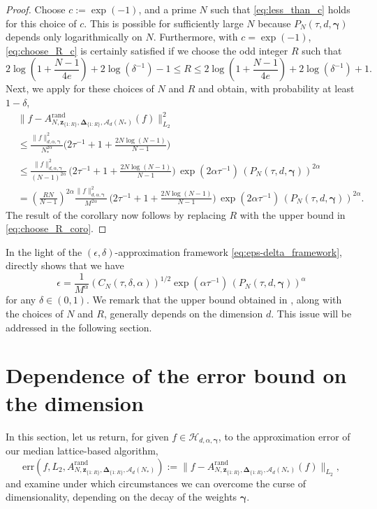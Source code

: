 \documentclass[pdflatex,sn-basic,Numbered]{sn-jnl}%
\newcommand{\rand}{\mathrm{rand}}
\newcommand{\bsz}{\boldsymbol{z}}
\newcommand{\bsgamma}{\boldsymbol{\gamma}}
\newcommand{\bsDelta}{\boldsymbol{\Delta}}
\newcommand{\Acal}{\mathcal{A}}
\newcommand{\Hcal}{\mathcal{H}}
\theoremstyle{thmstyleone}%
\theoremstyle{thmstyletwo}%
\begin{document}
\begin{proof}
 Choose $c := \exp(-1)$, and a prime $N$ such that \eqref{eq:less_than_c} holds for this choice of $c$. 
 This is possible for sufficiently large $N$ because $P_N(\tau,d,\bsgamma)$ depends only logarithmically on $N$. Furthermore, with $c = \exp(-1)$, \eqref{eq:choose_R_c} is certainly satisfied if we choose the odd integer $R$ such that
    \begin{equation}\label{eq:choose_R_coro}
        2\log \left(1 + \frac{N-1}{4e}\right)+2\log(\delta^{-1})-1
        \le R \le 
        2\log \left(1 + \frac{N-1}{4e}\right)+2\log(\delta^{-1})+1.
    \end{equation}
  Next, we apply  for these choices of $N$ and $R$ and obtain, with probability at least $1 - \delta$,
  \begin{align*}
  &\|f-A^{\rand}_{N,\bsz_{\{1{:}R\}},\bsDelta_{\{1{:}R\}},\Acal_d(N_*)}(f)\|^2_{L_2} \\
  &\le
  \frac{\|f\|^2_{d,\alpha,\bsgamma}}{N^{2\alpha}_*}\Big(2\tau^{-1}+1 + \frac{2N\log(N-1)}{N-1} \Big)\\
  &\le 
  \frac{\|f\|^2_{d,\alpha,\bsgamma}}{(N-1)^{2\alpha}}
  \,\Big(2\tau^{-1}+1 + \frac{2N\log(N-1)}{N-1} \Big)\, \exp(2\alpha\tau^{-1})\,
  (P_N (\tau,d,\bsgamma))^{2\alpha}\\
  &=
  \left(\frac{RN}{N-1}\right)^{2\alpha} \frac{\|f\|^2_{d,\alpha,\bsgamma}}{M^{2\alpha}}\,\Big(2\tau^{-1}+1 + \frac{2N\log(N-1)}{N-1} \Big)\,
  \exp(2\alpha\tau^{-1})\,
  (P_N (\tau,d,\bsgamma))^{2\alpha}.
  \end{align*}
  The result of the corollary now follows by replacing $R$ with the upper bound in \eqref{eq:choose_R_coro}.
\end{proof}

In the light of the $(\epsilon,\delta)$-approximation framework \eqref{eq:eps-delta_framework},  directly shows that we have
\[ \epsilon = \frac{1}{M^{\alpha}}(C_N(\tau,\delta,\alpha))^{1/2}
  \exp(\alpha\tau^{-1})\, (P_N(\tau,d,\bsgamma))^{\alpha}\]
for any $\delta\in (0,1)$.
We remark that the upper bound obtained in , along with the choices of $N$ and $R$, generally depends on the dimension $d$. This issue will be addressed in the following section.

\section{Dependence of the error bound on the dimension}\label{sec:tractability}
In this section, let us return, for given $f\in\Hcal_{d,\alpha,\bsgamma}$, to the approximation error of our median lattice-based algorithm,
\[
  \mathrm{err}(f,L_2, A^{\rand}_{N,\bsz_{\{1{:}R\}},\bsDelta_{\{1{:}R\}},\Acal_d(N_*)}):=\|f-A^{\rand}_{N,\bsz_{\{1{:}R\}},\bsDelta_{\{1{:}R\}},\Acal_d(N_*)}(f)\|_{L_2},
\]
and examine under which circumstances we can overcome the curse of dimensionality, depending on the decay of the weights $\bsgamma$.
\end{document}
